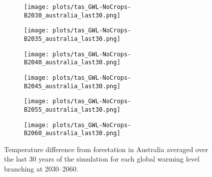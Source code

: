 \documentclass[]{article}
\begin{document}
\begin{figure}[H]
    \centering
    \begin{subfigure}[b]{0.4\linewidth}
        \texttt{[image: plots/tas\_GWL-NoCrops-B2030\_australia\_last30.png]}
    \end{subfigure}
    \begin{subfigure}[b]{0.4\linewidth}
        \texttt{[image: plots/tas\_GWL-NoCrops-B2035\_australia\_last30.png]}
    \end{subfigure}
    \begin{subfigure}[b]{0.4\linewidth}
        \texttt{[image: plots/tas\_GWL-NoCrops-B2040\_australia\_last30.png]}
    \end{subfigure}
    \begin{subfigure}[b]{0.4\linewidth}
        \texttt{[image: plots/tas\_GWL-NoCrops-B2045\_australia\_last30.png]}
    \end{subfigure}
    \begin{subfigure}[b]{0.4\linewidth}
        \texttt{[image: plots/tas\_GWL-NoCrops-B2055\_australia\_last30.png]}
    \end{subfigure}
    \begin{subfigure}[b]{0.4\linewidth}
        \texttt{[image: plots/tas\_GWL-NoCrops-B2060\_australia\_last30.png]}
    \end{subfigure}
    \caption{Temperature difference from forestation in Australia averaged over the last 30 years of the simulation for each global warming level branching at 2030--2060.  
    }
    \label{fig:tas_australia}
\end{figure}
\end{document}
